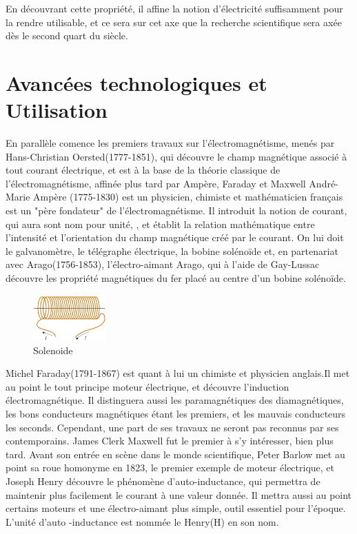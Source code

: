 \documentclass[12pt]{report}
\begin{document}
    En découvrant cette propriété, il affine la notion d'électricité suffisamment pour la rendre utilisable, et ce sera sur cet axe que la recherche scientifique sera axée dès le second quart du siècle.
\section{Avancées technologiques et Utilisation}
En parallèle comence les premiers travaux sur l'électromagnétisme, menés par Hans-Christian Oersted(1777-1851), qui découvre le champ magnétique associé à tout courant électrique, et est à la base de la théorie classique de l'électromagnétisme, affinée plus tard par Ampère, Faraday et Maxwell
André-Marie Ampère (1775-1830) est un physicien, chimiste et mathématicien français est un "père fondateur" de l'électromagnétisme. Il introduit la notion de courant, qui aura sont nom pour unité, , et établit la relation mathématique entre l'intensité et l'orientation du champ magnétique créé par le courant. On lui doit le galvanomètre, le télégraphe électrique, la bobine solénoïde et, en partenariat avec Arago(1756-1853), l'électro-aimant
Arago, qui à l'aide de Gay-Lussac découvre les propriété magnétiques du fer placé au centre d'un bobine solénoïde.

\begin{figure}
  \begin{center}
    \includegraphics[width=0.25\textwidth]{solenoide}
  \end{center}
  \caption{Solenoide}
\end{figure}
Michel Faraday(1791-1867) est quant à lui un chimiste et physicien anglais.Il met au point le tout principe moteur électrique, et découvre l'induction électromagnétique. Il distinguera aussi les paramagnétiques des diamagnétiques, les bons conducteurs magnétiques étant les premiers, et les mauvais conducteurs les seconds.
Cependant, une part de ses travaux ne seront pas reconnus par ses contemporains. James Clerk Maxwell fut le premier à s'y intéresser, bien plus tard. Avant son entrée en scène dans le monde scientifique, Peter Barlow met au point sa roue homonyme en 1823, le premier exemple de moteur électrique, et Joseph Henry découvre le phénomène d'auto-inductance, qui permettra de maintenir plus facilement le courant à une valeur donnée. Il mettra aussi au point certains moteurs et une électro-aimant plus simple, outil essentiel pour l'époque.
L'unité d'auto -inductance est nommée le Henry(H) en son nom.
\end{document}
